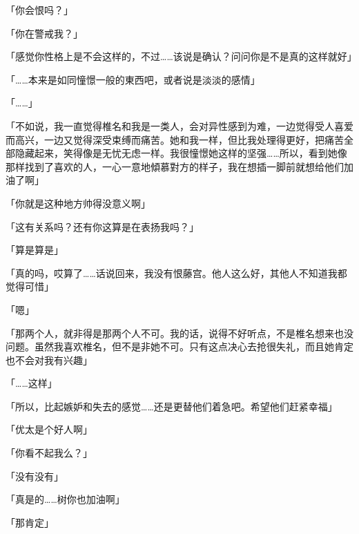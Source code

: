 「你会恨吗？」

「你在警戒我？」

「感觉你性格上是不会这样的，不过……该说是确认？问问你是不是真的这样就好」

「……本来是如同憧憬一般的東西吧，或者说是淡淡的感情」

「……」

「不如说，我一直觉得椎名和我是一类人，会对异性感到为难，一边觉得受人喜爱而高兴，一边又觉得深受束缚而痛苦。她和我一样，但比我处理得更好，把痛苦全部隐藏起来，笑得像是无忧无虑一样。我很憧憬她这样的坚强……所以，看到她像那样找到了喜欢的人，一心一意地傾慕對方的样子，我在想插一脚前就想给他们加油了啊」

「你就是这种地方帅得没意义啊」

「这有关系吗？还有你这算是在表扬我吗？」

「算是算是」

「真的吗，哎算了……话说回来，我没有恨藤宫。他人这么好，其他人不知道我都觉得可惜」

「嗯」

「那两个人，就非得是那两个人不可。我的话，说得不好听点，不是椎名想来也没问题。虽然我喜欢椎名，但不是非她不可。只有这点决心去抢很失礼，而且她肯定也不会对我有兴趣」

「……这样」

「所以，比起嫉妒和失去的感觉……还是更替他们着急吧。希望他们赶紧幸福」

「优太是个好人啊」

「你看不起我么？」

「没有没有」

「真是的……树你也加油啊」

「那肯定」
